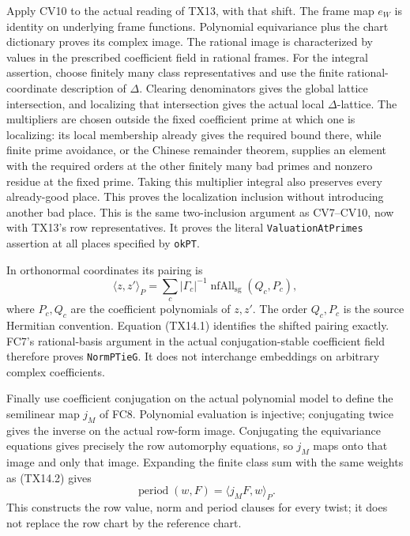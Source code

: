 Apply CV10 to the actual reading of TX13, with that shift.
The frame map \(e_W\) is identity on underlying frame
functions. Polynomial equivariance plus the chart dictionary
proves its complex image. The rational image is characterized
by values in the prescribed coefficient field in rational
frames. For the integral assertion, choose finitely many
class representatives and use the finite rational-coordinate
description of \(\Delta\). Clearing denominators gives the
global lattice intersection, and localizing that intersection
gives the actual local \(\Delta\)-lattice. The multipliers
are chosen outside the fixed coefficient prime at which one
is localizing: its local membership already gives the required
bound there, while finite prime avoidance, or the Chinese
remainder theorem, supplies an element with the required
orders at the other finitely many bad primes and nonzero
residue at the fixed prime. Taking this multiplier integral
also preserves every already-good place. This proves the
localization inclusion without introducing another bad place.
This is the same two-inclusion argument as CV7--CV10, now
with TX13's row representatives. It proves the literal
\texttt{ValuationAtPrimes} assertion at all places specified
by \texttt{okPT}.

In orthonormal coordinates its pairing is
\[
 \langle z,z'\rangle_P
 =\sum_c |\Gamma_c|^{-1}
     \operatorname{nfAll}_{\mathrm{sg}}(Q_c,P_c),
 \tag{TX14.2}
\]
where \(P_c,Q_c\) are the coefficient polynomials of \(z,z'\).
The order \(Q_c,P_c\) is the source Hermitian convention.
Equation (TX14.1) identifies the shifted pairing exactly.
FC7's rational-basis argument in the actual conjugation-stable
coefficient field therefore proves \texttt{NormPTieG}.
It does not interchange embeddings on arbitrary complex
coefficients.

Finally use coefficient conjugation on the actual polynomial
model to define the semilinear map \(j_M\) of FC8. Polynomial
evaluation is injective; conjugating twice gives the inverse
on the actual row-form image. Conjugating the equivariance
equations gives precisely the row automorphy equations, so
\(j_M\) maps onto that image and only that image. Expanding
the finite class sum with the same weights as (TX14.2) gives
\[
 \operatorname{period}(w,F)=\langle j_MF,w\rangle_P.
 \tag{TX14.3}
\]
This constructs the row value, norm and period clauses for
every twist; it does not replace the row chart by the
reference chart.

